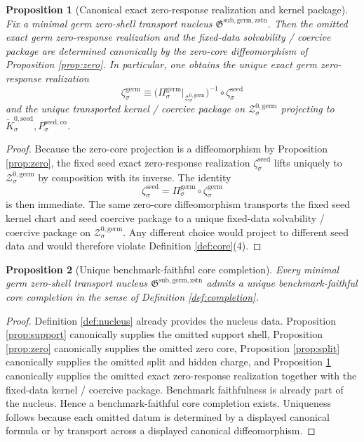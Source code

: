 \documentclass[11pt]{article}
\newcommand{\SeedEmbed}[1]{\zeta_{#1}^{\mathrm{seed}}}
\newcommand{\SeedKernel}[1]{\widetilde K_{#1}^{0,\mathrm{seed}}}
\newcommand{\SeedCoercive}[1]{P_{#1}^{\mathrm{seed,co}}}
\newcommand{\GermNucleus}{\mathfrak G^{\mathrm{sub,germ,zstn}}}
\newcommand{\GermProj}[1]{\Pi_{#1}^{\mathrm{germ}}}
\newcommand{\GermZeroCore}[1]{\mathcal Z_{#1}^{0,\mathrm{germ}}}
\newcommand{\GermEmbed}[1]{\zeta_{#1}^{\mathrm{germ}}}
\newtheorem{proposition}{Proposition}
\begin{document}
\begin{proposition}[Canonical exact zero-response realization and kernel package]
\label{prop:kernel}
Fix a minimal germ zero-shell transport nucleus \(\GermNucleus\). Then the omitted exact germ zero-response realization and the fixed-data solvability / coercive package are determined canonically by the zero-core diffeomorphism of Proposition \ref{prop:zero}. In particular, one obtains the unique exact germ zero-response realization
\[
\GermEmbed{\sigma}
\equiv
\bigl(\GermProj{\sigma}\big|_{\GermZeroCore{\sigma}}\bigr)^{-1}
\circ
\SeedEmbed{\sigma}
\]
and the unique transported kernel / coercive package on \(\GermZeroCore{\sigma}\) projecting to \(\SeedKernel{\sigma},\SeedCoercive{\sigma}\).
\end{proposition}

\begin{proof}
Because the zero-core projection is a diffeomorphism by Proposition \ref{prop:zero}, the fixed seed exact zero-response realization \(\SeedEmbed{\sigma}\) lifts uniquely to \(\GermZeroCore{\sigma}\) by composition with its inverse. The identity
\[
\SeedEmbed{\sigma}
=
\GermProj{\sigma}\circ\GermEmbed{\sigma}
\]
is then immediate. The same zero-core diffeomorphism transports the fixed seed kernel chart and seed coercive package to a unique fixed-data solvability / coercive package on \(\GermZeroCore{\sigma}\). Any different choice would project to different seed data and would therefore violate Definition \ref{def:core}(4).
\end{proof}

\begin{proposition}[Unique benchmark-faithful core completion]
\label{prop:completion}
Every minimal germ zero-shell transport nucleus \(\GermNucleus\) admits a unique benchmark-faithful core completion in the sense of Definition \ref{def:completion}.
\end{proposition}

\begin{proof}
Definition \ref{def:nucleus} already provides the nucleus data. Proposition \ref{prop:support} canonically supplies the omitted support shell, Proposition \ref{prop:zero} canonically supplies the omitted zero core, Proposition \ref{prop:split} canonically supplies the omitted split and hidden charge, and Proposition \ref{prop:kernel} canonically supplies the omitted exact zero-response realization together with the fixed-data kernel / coercive package. Benchmark faithfulness is already part of the nucleus. Hence a benchmark-faithful core completion exists. Uniqueness follows because each omitted datum is determined by a displayed canonical formula or by transport across a displayed canonical diffeomorphism.
\end{proof}
\end{document}
